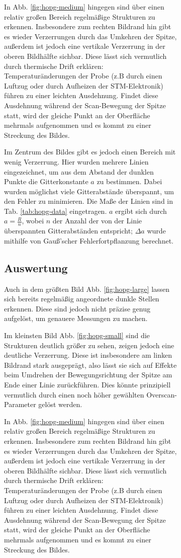 \documentclass{article}
\begin{document}
\begin{figure}[h]
\begin{figure}[h]
In Abb. \ref{fig:hopg-medium} hingegen sind über einen relativ großen Bereich regelmäßige Strukturen zu erkennen.
Insbesondere zum rechten Bildrand hin gibt es wieder Verzerrungen durch das Umkehren der Spitze, außerdem ist
jedoch eine vertikale Verzerrung in der oberen Bildhälfte sichbar. Diese lässt sich vermutlich durch thermische Drift erklären:
Temperaturänderungen der Probe (z.B durch einen Luftzug oder durch Aufheizen der STM-Elektronik) führen zu einer leichten Ausdehnung.
Findet diese Ausdehnung während der Scan-Bewegung der Spitze statt, wird der gleiche Punkt an der Oberfläche mehrmals aufgenommen
und es kommt zu einer Streckung des Bildes.

Im Zentrum des Bildes gibt es jedoch einen Bereich mit wenig Verzerrung.
Hier wurden mehrere Linien eingezeichnet, um aus dem Abstand der dunklen Punkte die Gitterkonstante $a$
zu bestimmen. Dabei wurden möglichst viele Gitterabstände überspannt, um den Fehler zu minimieren.
Die Maße der Linien sind in Tab. \ref{tab:hopg-data} eingetragen. $a$ ergibt sich durch $a=\frac{R}{n}$, wobei $n$
der Anzahl der von der Linie überspannten Gitterabständen entspricht;
$\Delta a$ wurde mithilfe von Gauß'scher Fehlerfortpflanzung berechnet.

\subsection{Auswertung}
Auch in dem größten Bild Abb. \ref{fig:hopg-large} lassen sich bereits regelmäßig angeordnete dunkle Stellen erkennen.
Diese sind jedoch nicht präzise genug aufgelöst, um genauere Messungen zu machen.

Im kleinsten Bild Abb. \ref{fig:hopg-small} sind die Strukturen deutlich größer zu sehen, zeigen jedoch eine deutliche Verzerrung.
Diese ist insbesondere am linken Bildrand stark ausgeprägt, also lässt sie sich auf Effekte beim Umdrehen der Bewegungsrichtung der
Spitze am Ende einer Linie zurückführen. Dies könnte prinzipiell vermutlich durch einen noch höher gewählten Overscan-Parameter
gelöst werden.

In Abb. \ref{fig:hopg-medium} hingegen sind über einen relativ großen Bereich regelmäßige Strukturen zu erkennen.
Insbesondere zum rechten Bildrand hin gibt es wieder Verzerrungen durch das Umkehren der Spitze, außerdem ist
jedoch eine vertikale Verzerrung in der oberen Bildhälfte sichbar. Diese lässt sich vermutlich durch thermische Drift erklären:
Temperaturänderungen der Probe (z.B durch einen Luftzug oder durch Aufheizen der STM-Elektronik) führen zu einer leichten Ausdehnung.
Findet diese Ausdehnung während der Scan-Bewegung der Spitze statt, wird der gleiche Punkt an der Oberfläche mehrmals aufgenommen
und es kommt zu einer Streckung des Bildes.


\end{figure}
\end{figure}
\end{document}
